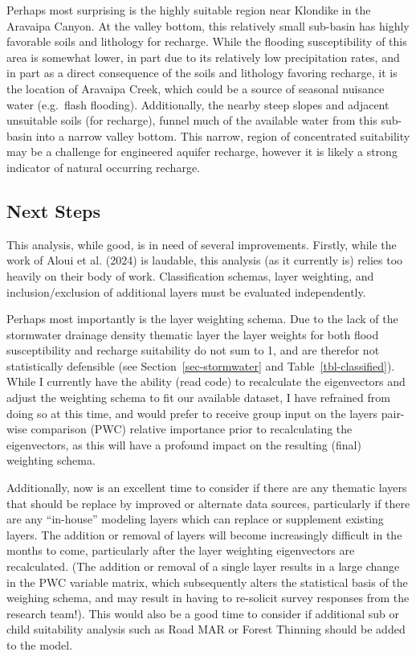 \documentclass[
]{agujournal2019}
\begin{document}
Perhaps most surprising is the highly suitable region near Klondike in
the Aravaipa Canyon. At the valley bottom, this relatively small
sub-basin has highly favorable soils and lithology for recharge. While
the flooding susceptibility of this area is somewhat lower, in part due
to its relatively low precipitation rates, and in part as a direct
consequence of the soils and lithology favoring recharge, it is the
location of Aravaipa Creek, which could be a source of seasonal nuisance
water (e.g.~flash flooding). Additionally, the nearby steep slopes and
adjacent unsuitable soils (for recharge), funnel much of the available
water from this sub-basin into a narrow valley bottom. This narrow,
region of concentrated suitability may be a challenge for engineered
aquifer recharge, however it is likely a strong indicator of natural
occurring recharge.

\subsection{Next Steps}\label{next-steps}

This analysis, while good, is in need of several improvements. Firstly,
while the work of Aloui et al. (2024) is laudable, this analysis (as it
currently is) relies too heavily on their body of work. Classification
schemas, layer weighting, and inclusion/exclusion of additional layers
must be evaluated independently.

Perhaps most importantly is the layer weighting schema. Due to the lack
of the stormwater drainage density thematic layer the layer weights for
both flood susceptibility and recharge suitability do not sum to 1, and
are therefor not statistically defensible (see
Section~\ref{sec-stormwater} and Table~\ref{tbl-classified}). While I
currently have the ability (read code) to recalculate the eigenvectors
and adjust the weighting schema to fit our available dataset, I have
refrained from doing so at this time, and would prefer to receive group
input on the layers pair-wise comparison (PWC) relative importance prior
to recalculating the eigenvectors, as this will have a profound impact
on the resulting (final) weighting schema.

Additionally, now is an excellent time to consider if there are any
thematic layers that should be replace by improved or alternate data
sources, particularly if there are any ``in-house'' modeling layers
which can replace or supplement existing layers. The addition or removal
of layers will become increasingly difficult in the months to come,
particularly after the layer weighting eigenvectors are recalculated.
(The addition or removal of a single layer results in a large change in
the PWC variable matrix, which subsequently alters the statistical basis
of the weighing schema, and may result in having to re-solicit survey
responses from the research team!). This would also be a good time to
consider if additional sub or child suitability analysis such as Road
MAR or Forest Thinning should be added to the model.
\end{document}
